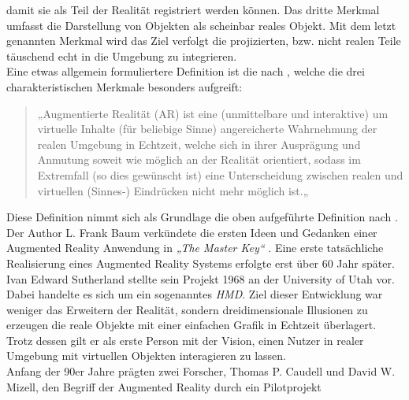 damit sie als Teil der Realität registriert werden können. Das dritte Merkmal umfasst die Darstellung von Objekten als scheinbar reales 
Objekt. Mit dem letzt genannten Merkmal wird das Ziel verfolgt die projizierten, bzw. nicht realen Teile täuschend echt in die Umgebung zu 
integrieren.
\\ 
\linebreak  
Eine etwas allgemein formuliertere Definition ist die nach \cite{springer.2019s}, welche die drei charakteristischen Merkmale besonders 
aufgreift:
\begin{quote}
    „Augmentierte Realität (AR) ist eine (unmittelbare und interaktive) um virtuelle Inhalte (für beliebige Sinne) angereicherte Wahrnehmung der 
    realen Umgebung in Echtzeit, welche sich in ihrer Ausprägung und Anmutung soweit wie möglich an der Realität orientiert, sodass im 
    Extremfall (so dies gewünscht ist) eine Unterscheidung zwischen realen und virtuellen (Sinnes-) Eindrücken nicht mehr möglich ist.„ \cite{springer.2019s}
\end{quote}
Diese Definition nimmt sich als Grundlage die oben aufgeführte Definition nach \cite{azuma.1997a}.
\\ 
\linebreak
Der Author L. Frank Baum \cite{frankbaum.1856m} verkündete die ersten Ideen und Gedanken einer Augmented Reality Anwendung in 
\textit{„The Master Key“} \cite{masterkey.1996f}. Eine erste tatsächliche Realisierung eines Augmented Reality Systems erfolgte erst über 
60 Jahr später. Ivan Edward Sutherland \cite{sutherlandbio.1938m} stellte sein Projekt 1968 an der University of Utah vor. Dabei handelte es 
sich um ein sogenanntes \textit{\ac{HMD}}. Ziel dieser Entwicklung war weniger das Erweitern der Realität, sondern dreidimensionale 
Illusionen zu erzeugen die reale Objekte mit einer einfachen Grafik in Echtzeit überlagert. %
Trotz dessen gilt er als erste Person mit der Vision, einen Nutzer in realer Umgebung mit virtuellen Objekten interagieren zu lassen.
\\ 
Anfang der 90er Jahre prägten zwei Forscher, Thomas P. Caudell und David W. Mizell, den Begriff der Augmented Reality durch ein Pilotprojekt
